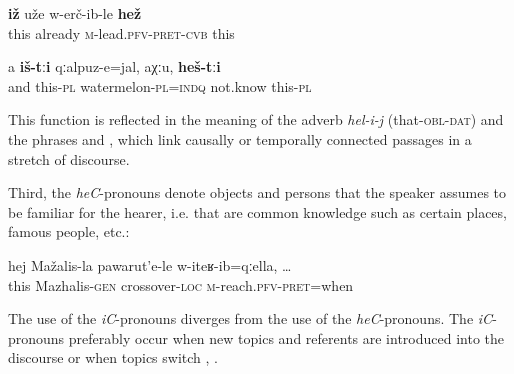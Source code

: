 \begin{exe}
	\ex	\label{They already carried him away}
	\gll	\textbf{iž}	uže	w-erč-ib-le	\textbf{hež} \\
		this	already	\textsc{m}-lead.\textsc{pfv}-\textsc{pret}-\textsc{cvb}	this\\
	\glt	{}
	
	\ex	\label{and these are watermelons, I don't know, these}
	\gll	a	\textbf{iš-tːi}	qːalpuz-e=jal,	aχːu,	\textbf{heš-tːi} \\
		and	this-\textsc{pl}	watermelon-\textsc{pl}=\textsc{indq}	not.know	this-\textsc{pl}\\
	\glt 	{}
\end{exe}


This function is reflected in the meaning of the adverb \textit{hel-i-j} (that-\textsc{obl}-\textsc{dat})  and the phrases   and  , which link causally or temporally connected passages in a stretch of discourse.

Third, the \textit{heC}-pronouns denote objects and persons that the speaker assumes to be familiar for the hearer, i.e. that are common knowledge such as certain places, famous people, etc.:

\begin{exe}
	\ex	\label{when I reached the crossover of Mazhalis}
	\gll	hej	Mažalis-la	pawarut'e-le	w-iteʁ-ib=qːella, \ldots\\
		this	Mazhalis-\textsc{gen}	crossover-\textsc{loc}	\textsc{m}-reach.\textsc{pfv}-\textsc{pret}=when\\
	\glt	{}
\end{exe}

The use of the \textit{iC}-pronouns diverges from the use of the \textit{heC}-pro\-nouns. The \textit{iC}-pro\-nouns preferably occur when new topics and referents are introduced into the discourse  or when topics switch , .

